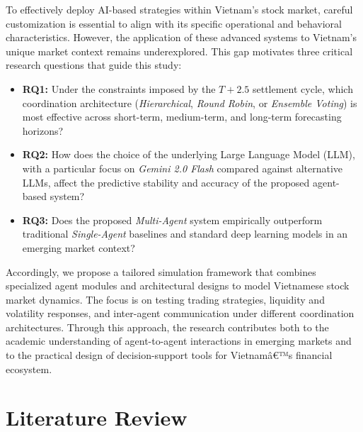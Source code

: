 \documentclass{ieeeaccess}
\begin{document}
To effectively deploy AI-based strategies within Vietnam's stock market, careful customization is essential to align with its specific operational and behavioral characteristics. However, the application of these advanced systems to Vietnam's unique market context remains underexplored. This gap motivates three critical research questions that guide this study:

\begin{itemize}
    
    \item \textbf{RQ1:} Under the constraints imposed by the $T+2.5$ settlement cycle, which coordination architecture (\textit{Hierarchical}, \textit{Round Robin}, or \textit{Ensemble Voting}) is most effective across short-term, medium-term, and long-term forecasting horizons?
    
    \item \textbf{RQ2:} How does the choice of the underlying Large Language Model (LLM), with a particular focus on \textit{Gemini 2.0 Flash} compared against alternative LLMs, affect the predictive stability and accuracy of the proposed agent-based system?

    \item \textbf{RQ3:} Does the proposed \textit{Multi-Agent} system empirically outperform traditional \textit{Single-Agent} baselines and standard deep learning models in an emerging market context?

\end{itemize}

Accordingly, we propose a tailored simulation framework that combines specialized agent modules and architectural designs to model Vietnamese stock market dynamics. The focus is on testing trading strategies, liquidity and volatility responses, and inter-agent communication under different coordination architectures. Through this approach, the research contributes both to the academic understanding of agent-to-agent interactions in emerging markets and to the practical design of decision-support tools for Vietnamâ€™s financial ecosystem.



\section{Literature Review}
\label{sec:Literature Review}
\end{document}
